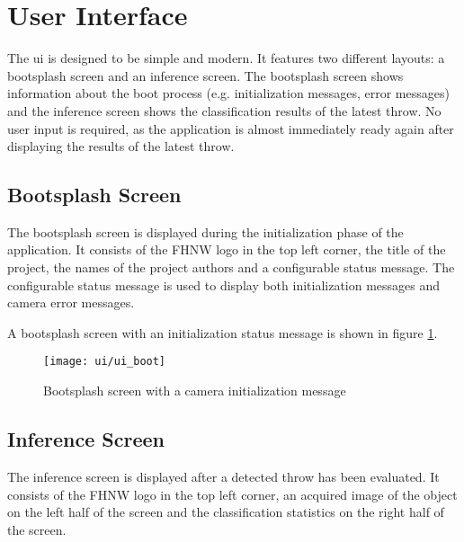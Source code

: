 \section{User Interface}
\label{sec:inference:user_interface}

The \acrfull{ui} is designed to be simple and modern.
It features two different layouts: a bootsplash screen and an inference screen.
The bootsplash screen shows information about the boot process (e.g. initialization messages, error messages) and the inference screen shows the classification results of the latest throw.
No user input is required, as the application is almost immediately ready again after displaying the results of the latest throw.

\subsection{Bootsplash Screen}
\label{subsec:inference:user_interface:bootsplash_screen}

The bootsplash screen is displayed during the initialization phase of the application.
It consists of the FHNW logo in the top left corner, the title of the project, the names of the project authors and a configurable status message.
The configurable status message is used to display both initialization messages and camera error messages.

A bootsplash screen with an initialization status message is shown in figure \ref{fig:ui_boot}.

\begin{figure}
  \centering
  \texttt{[image: ui/ui\_boot]}
  \caption{Bootsplash screen with a camera initialization message}
  \label{fig:ui_boot}
\end{figure}

\subsection{Inference Screen}
\label{subsec:inference:user_interface:inference_screen}

The inference screen is displayed after a detected throw has been evaluated.
It consists of the FHNW logo in the top left corner, an acquired image of the object on the left half of the screen and the classification statistics on the right half of the screen.

